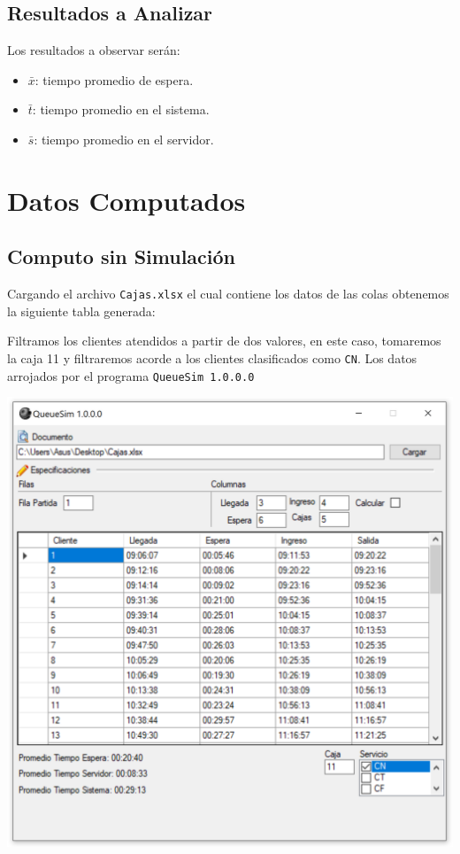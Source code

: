 \documentclass[10pt,letterpaper]{report}
\begin{document}
\subsection*{Resultados a Analizar}
Los resultados a observar serán:
\begin{itemize}
\item $\bar{x}$: tiempo promedio de espera. 
\item $\bar{t}$: tiempo promedio en el sistema. 
\item $\bar{s}$: tiempo promedio en el servidor. 
\end{itemize}
\section*{Datos Computados}
\subsection*{Computo sin Simulación}
Cargando el archivo \texttt{Cajas.xlsx} el cual contiene los datos de las colas obtenemos la siguiente tabla generada:

Filtramos los clientes atendidos a partir de dos valores, en este caso, tomaremos la caja 11 y filtraremos acorde a los clientes clasificados como \texttt{CN}. Los datos arrojados por el programa \texttt{QueueSim 1.0.0.0}
\begin{center}
\includegraphics[scale=0.5]{QueueSim_screenshot}
\end{center}
\end{document}
